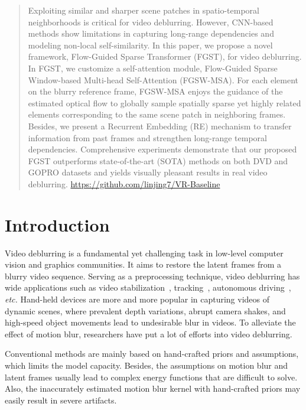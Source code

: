 \documentclass{article}
\begin{document}
	
	\begin{abstract}
		\vspace{-1mm}
		Exploiting similar and sharper scene patches in spatio-temporal neighborhoods is critical for video deblurring. However, CNN-based methods show limitations in capturing long-range dependencies and modeling non-local self-similarity. In this paper, we propose a novel framework, Flow-Guided Sparse Transformer (FGST), for video deblurring. In FGST, we customize a self-attention module, Flow-Guided Sparse Window-based Multi-head Self-Attention (FGSW-MSA). For each  element on the blurry reference frame, FGSW-MSA enjoys the guidance of the estimated optical flow to globally sample spatially sparse yet highly related  elements corresponding to the same scene patch in neighboring frames. Besides, we present a Recurrent Embedding (RE) mechanism to transfer information from past frames and strengthen long-range temporal dependencies. Comprehensive experiments demonstrate that our proposed FGST outperforms state-of-the-art (SOTA) methods on both DVD and GOPRO datasets and yields visually pleasant results in real video deblurring.  \url{https://github.com/linjing7/VR-Baseline}
	\end{abstract}
	
	\vspace{-4mm}
	\section{Introduction}
	\vspace{-1mm}
	\label{introduction}
	
	Video deblurring is a fundamental yet challenging task in low-level computer vision and graphics communities. It aims to restore the latent frames from a blurry video sequence. Serving as a preprocessing technique, video deblurring has wide applications such as video stabilization~\cite{matsushita2006full}, tracking~\cite{track}, autonomous driving~\cite{3d_det}, \emph{etc.}  Hand-held devices are more and more popular in capturing videos of dynamic scenes, where prevalent depth variations, abrupt camera shakes, and high-speed object movements lead to undesirable blur in videos. To alleviate the effect of motion blur, researchers have put a lot of efforts into video deblurring.  
	
	Conventional methods are mainly based on hand-crafted priors and assumptions, which limits the model capacity. Besides, the assumptions on motion blur and latent frames usually lead to complex energy functions that are difficult to solve. Also, the inaccurately estimated motion blur kernel with hand-crafted priors may easily result in severe artifacts.
	
\end{document}

